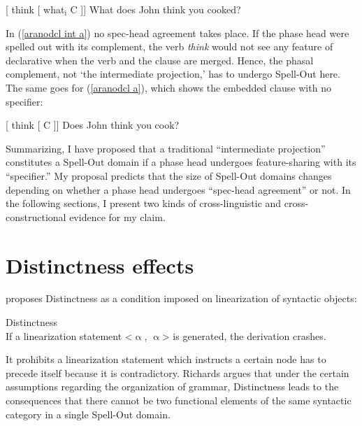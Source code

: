 \documentclass[output=paper]{langscibook}
\begin{document}
\ea 
\ea 
\label{aranodcl int a} {} \textup{
 [ think [ what$_\mathrm{i}$ C ]]
  }  
\ex What does John think you cooked? \label{aranodcl int b}  
\z 
\z 

\noindent In (\ref{aranodcl int a}) no spec-head agreement takes place. If the phase head were spelled out with its complement, the verb \emph{think} would not see any feature of declarative when the verb and the clause are merged. Hence, the phasal complement, not `the intermediate projection,' has to undergo Spell-Out here. The same goes for (\ref{aranodcl a}), which shows the embedded clause with no specifier:

\ea 
\ea 
\label{aranodcl a} {} \textup{
 [ think [ C ]]
  }  
\ex Does John think you cook?
\z 
\z 

Summarizing, I have proposed that a traditional ``intermediate projection'' constitutes a Spell-Out domain if a phase head undergoes feature-sharing with its ``specifier.'' My proposal predicts that the size of Spell-Out domains changes depending on whether a phase head undergoes  ``spec-head agreement'' or not. In the following sections, I present two kinds of cross-linguistic and cross-construc\-tional evidence for my claim.


\section{Distinctness effects}\label{aranosect3}
\citet{Richards:2010} proposes Distinctness as a condition imposed on linearization of syntactic objects:

\ea\upshape
Distinctness\\
If a linearization statement <$\upalpha$, $\upalpha$> is generated, the derivation crashes.
\z 

\noindent It prohibits a linearization statement which instructs a  certain node has to precede itself because it is contradictory. Richards argues that under the certain assumptions regarding the organization of grammar, Distinctness leads to the consequences that there cannot be two functional elements of the same syntactic category in a single Spell-Out domain. 
\end{document}
